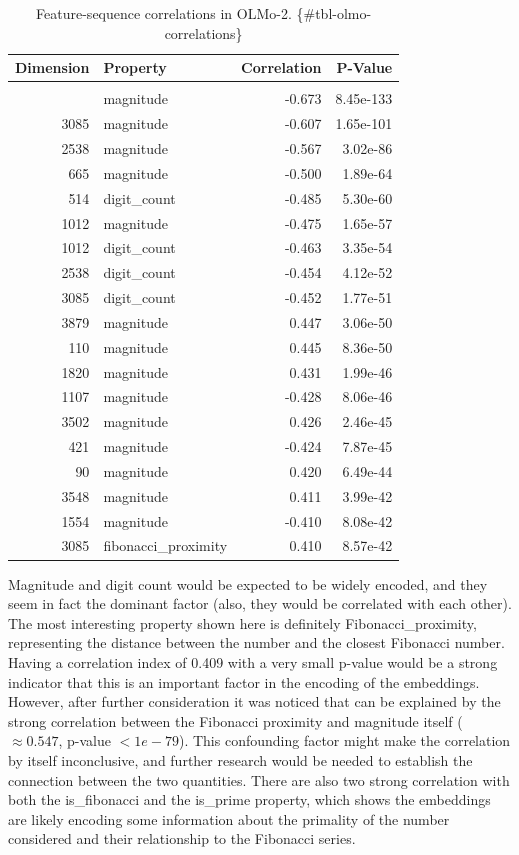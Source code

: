 \documentclass[
  a4paper, twoside, 10pt, titlepage]{book}
\begin{document}
\begin{longtable}[]{@{}rlrr@{}}
\toprule\noalign{}
\textbf{Dimension} & \textbf{Property} & \textbf{Correlation} &
\textbf{P-Value} \\
\midrule\noalign{}
\endhead
\bottomrule\noalign{}
\tabularnewline
\caption{Feature-sequence correlations in OLMo-2.
\{\#tbl-olmo-correlations\}}
\endlastfoot
514 & magnitude & -0.673 & 8.45e-133 \\
3085 & magnitude & -0.607 & 1.65e-101 \\
2538 & magnitude & -0.567 & 3.02e-86 \\
665 & magnitude & -0.500 & 1.89e-64 \\
514 & digit\_count & -0.485 & 5.30e-60 \\
1012 & magnitude & -0.475 & 1.65e-57 \\
1012 & digit\_count & -0.463 & 3.35e-54 \\
2538 & digit\_count & -0.454 & 4.12e-52 \\
3085 & digit\_count & -0.452 & 1.77e-51 \\
3879 & magnitude & 0.447 & 3.06e-50 \\
110 & magnitude & 0.445 & 8.36e-50 \\
1820 & magnitude & 0.431 & 1.99e-46 \\
1107 & magnitude & -0.428 & 8.06e-46 \\
3502 & magnitude & 0.426 & 2.46e-45 \\
421 & magnitude & -0.424 & 7.87e-45 \\
90 & magnitude & 0.420 & 6.49e-44 \\
3548 & magnitude & 0.411 & 3.99e-42 \\
1554 & magnitude & -0.410 & 8.08e-42 \\
3085 & fibonacci\_proximity & 0.410 & 8.57e-42 \\
\end{longtable}

Magnitude and digit count would be expected to be widely encoded, and
they seem in fact the dominant factor (also, they would be correlated
with each other). The most interesting property shown here is definitely
Fibonacci\_proximity, representing the distance between the number and
the closest Fibonacci number. Having a correlation index of 0.409 with a
very small p-value would be a strong indicator that this is an important
factor in the encoding of the embeddings. However, after further
consideration it was noticed that can be explained by the strong
correlation between the Fibonacci proximity and magnitude itself
(\(\approx 0.547\), p-value \(< 1e-79\)). This confounding factor might
make the correlation by itself inconclusive, and further research would
be needed to establish the connection between the two quantities. There
are also two strong correlation with both the is\_fibonacci and the
is\_prime property, which shows the embeddings are likely encoding some
information about the primality of the number considered and their
relationship to the Fibonacci series.
\end{document}
